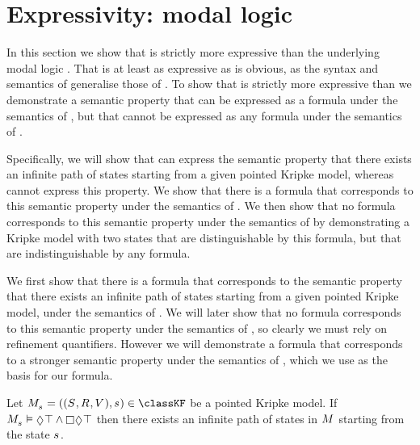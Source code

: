 \section{Expressivity: modal logic}\label{rml-k4-ml}

In this section we show that \logicRmlKF{} is strictly more expressive than the underlying modal logic \logicKF{}.
That \logicRmlKF{} is at least as expressive as \logicKF{} is obvious, as the syntax and semantics of \logicRmlKF{} generalise those of \logicKF{}.
To show that \logicRmlKF{} is strictly more expressive than \logicKF{} we demonstrate a semantic property that can be expressed as a \langRml{} formula under the semantics of \logicRmlKF{}, but that cannot be expressed as any \langMl{} formula under the semantics of \logicKF{}.

Specifically, we will show that \logicRmlKF{} can express the semantic property that there exists an infinite path of states starting from a given pointed Kripke model, whereas \logicKF{} cannot express this property.
We show that there is a \langRml{} formula that corresponds to this semantic property under the semantics of \logicRmlKF{}.
We then show that no \langMl{} formula corresponds to this semantic property under the semantics of \logicKF{} by demonstrating a \classKF{} Kripke model with two states that are distinguishable by this \langRml{} formula, but that are indistinguishable by any \langMl{} formula.

We first show that there is a \langRml{} formula that corresponds to the semantic property that there exists an infinite path of states starting from a given pointed Kripke model, under the semantics of \logicRmlKF{}.
We will later show that no \langMl{} formula corresponds to this semantic property under the semantics of \logicKF{}, so clearly we must rely on refinement quantifiers.
However we will demonstrate a \langMl{} formula that corresponds to a stronger semantic property under the semantics of \logicKF{}, which we use as the basis for our \langRml{} formula.

\begin{lemma}\label{rml-k4-all-infinite-paths}
Let $\kPModelAndTuple{\kStateS} \in \classKF$ be a pointed Kripke model.
If $\kPModel{\kStateS} \entails \possible \top \land \necessary \possible \top$ then there exists an infinite path of states in $\kModel$ starting from the state $\kStateS$.
\end{lemma}

